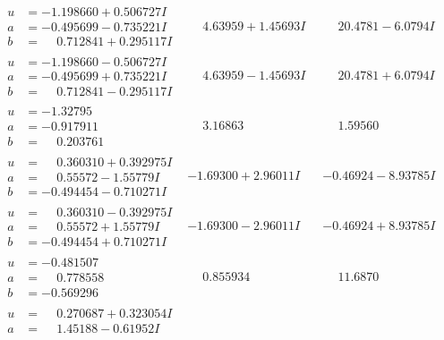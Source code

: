 \documentclass[1p]{elsarticle_modified}
\theoremstyle{definition}
\begin{document}
$$\begin{array}{c|c|c}
\begin{aligned}
u &= -1.198660 + 0.506727 I \\
a &= -0.495699 - 0.735221 I \\
b &= \phantom{-}0.712841 + 0.295117 I\end{aligned}
 & \phantom{-}4.63959 + 1.45693 I & \phantom{-}20.4781 - 6.0794 I \\ \hline\begin{aligned}
u &= -1.198660 - 0.506727 I \\
a &= -0.495699 + 0.735221 I \\
b &= \phantom{-}0.712841 - 0.295117 I\end{aligned}
 & \phantom{-}4.63959 - 1.45693 I & \phantom{-}20.4781 + 6.0794 I \\ \hline\begin{aligned}
u &= -1.32795\phantom{ +0.000000I} \\
a &= -0.917911\phantom{ +0.000000I} \\
b &= \phantom{-}0.203761\phantom{ +0.000000I}\end{aligned}
 & \phantom{-}3.16863\phantom{ +0.000000I} & \phantom{-}1.59560\phantom{ +0.000000I} \\ \hline\begin{aligned}
u &= \phantom{-}0.360310 + 0.392975 I \\
a &= \phantom{-}0.55572 - 1.55779 I \\
b &= -0.494454 - 0.710271 I\end{aligned}
 & -1.69300 + 2.96011 I & -0.46924 - 8.93785 I \\ \hline\begin{aligned}
u &= \phantom{-}0.360310 - 0.392975 I \\
a &= \phantom{-}0.55572 + 1.55779 I \\
b &= -0.494454 + 0.710271 I\end{aligned}
 & -1.69300 - 2.96011 I & -0.46924 + 8.93785 I \\ \hline\begin{aligned}
u &= -0.481507\phantom{ +0.000000I} \\
a &= \phantom{-}0.778558\phantom{ +0.000000I} \\
b &= -0.569296\phantom{ +0.000000I}\end{aligned}
 & \phantom{-}0.855934\phantom{ +0.000000I} & \phantom{-}11.6870\phantom{ +0.000000I} \\ \hline\begin{aligned}
u &= \phantom{-}0.270687 + 0.323054 I \\
a &= \phantom{-}1.45188 - 0.61952 I \\

\end{aligned}
\end{array}$$
\end{document}

